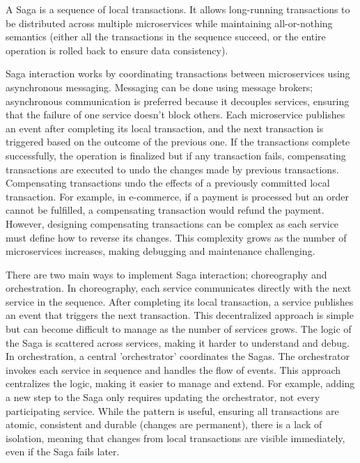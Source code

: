 \documentclass[]{final}
\begin{document}
A Saga is a sequence of local transactions. %
It allows long-running transactions to be distributed across multiple
microservices while maintaining all-or-nothing semantics
(either all the transactions in the sequence succeed, or the entire operation
is rolled back to ensure data consistency).

Saga interaction works by coordinating transactions between microservices using
asynchronous messaging.
Messaging can be done using message brokers; asynchronous communication is
preferred because it decouples services, ensuring that the failure of one
service doesn’t block others. %
Each microservice publishes an event after completing its local transaction,
and the next transaction is triggered based on the outcome of the previous
one. If the transactions complete successfully, the operation is finalized
but if any transaction fails, compensating transactions are executed to
undo the changes made by previous transactions. %
Compensating transactions undo the effects of a previously committed local
transaction. For example, in e-commerce, if a payment is processed but an
order cannot be fulfilled, a compensating transaction would refund the
payment. However, designing compensating transactions can be complex as each
service must define how to reverse its changes. This complexity grows as
the number of microservices increases, making debugging and maintenance
challenging.

There are two main ways to implement Saga interaction; choreography and
orchestration. In choreography, each service communicates directly with the
next service in the sequence. After completing its local transaction, a
service publishes an event that triggers the next transaction. This
decentralized approach is simple but can become difficult to manage as the
number of services grows. The logic of the Saga is scattered across
services, making it harder to understand and debug. %
In orchestration, a central 'orchestrator' coordinates the Sagas. The orchestrator
invokes each service in sequence and handles the flow of events. This approach
centralizes the logic, making it easier to manage and extend. For example,
adding a new step to the Saga only requires updating the orchestrator,
not every participating service. %
While the pattern is useful, ensuring all transactions are atomic, consistent and
durable (changes are permanent), there is a lack of isolation, meaning that
changes from local transactions are visible immediately, even if the Saga fails
later.
\end{document}
